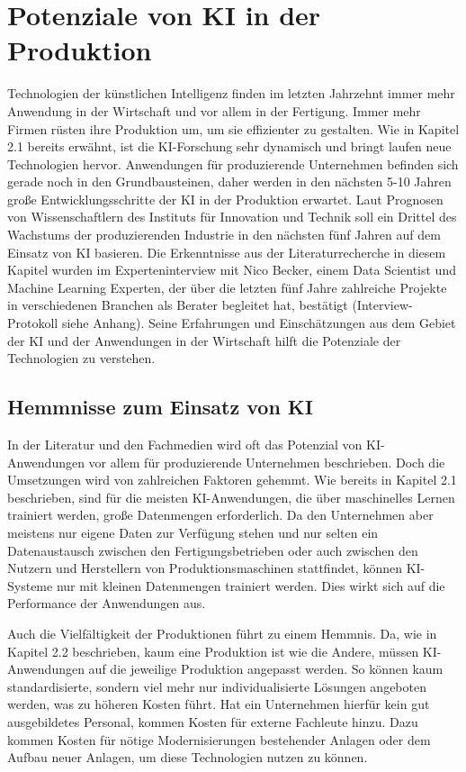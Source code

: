 \documentclass[a4paper,12pt, german]{report}
\begin{document}
\chapter{Potenziale von KI in der Produktion}
Technologien der künstlichen Intelligenz finden im letzten Jahrzehnt immer mehr Anwendung in der Wirtschaft und vor allem in der Fertigung. Immer mehr Firmen rüsten ihre Produktion um, um sie effizienter zu gestalten. Wie in Kapitel 2.1 bereits erwähnt, ist die KI-Forschung sehr dynamisch und bringt laufen neue Technologien hervor. Anwendungen für produzierende Unternehmen befinden sich gerade noch in den Grundbausteinen, daher werden in den nächsten 5-10 Jahren große Entwicklungsschritte der KI in der Produktion erwartet.\cite{08} 
Laut Prognosen von Wissenschaftlern des Instituts für Innovation und Technik soll ein Drittel des Wachstums der produzierenden Industrie in den nächsten fünf Jahren auf dem Einsatz von KI basieren.\cite{24}
Die Erkenntnisse aus der Literaturrecherche in diesem Kapitel wurden im Experteninterview mit Nico Becker, einem Data Scientist und Machine Learning Experten, der über die letzten fünf Jahre zahlreiche Projekte in verschiedenen Branchen als Berater begleitet hat, bestätigt (Interview-Protokoll siehe Anhang).\cite{41} Seine Erfahrungen und Einschätzungen aus dem Gebiet der KI und der Anwendungen in der Wirtschaft hilft die Potenziale der Technologien zu verstehen.

\section{Hemmnisse zum Einsatz von KI}
In der Literatur und den Fachmedien wird oft das Potenzial von KI-Anwendungen vor allem für produzierende Unternehmen beschrieben. Doch die Umsetzungen wird von zahlreichen Faktoren gehemmt. Wie bereits in Kapitel 2.1 beschrieben, sind für die meisten KI-Anwendungen, die über maschinelles Lernen trainiert werden, große Datenmengen erforderlich. Da den Unternehmen aber meistens nur eigene Daten zur Verfügung stehen und nur selten ein Datenaustausch zwischen den Fertigungsbetrieben oder auch zwischen den Nutzern und Herstellern von Produktionsmaschinen stattfindet, können KI-Systeme nur mit kleinen Datenmengen trainiert werden. Dies wirkt sich auf die Performance der Anwendungen aus.\cite{41}

Auch die Vielfältigkeit der Produktionen führt zu einem Hemmnis. Da, wie in Kapitel 2.2 beschrieben, kaum eine Produktion ist wie die Andere, müssen KI-Anwendungen auf die jeweilige Produktion angepasst werden. So können kaum standardisierte, sondern viel mehr nur individualisierte Lösungen angeboten werden, was zu höheren Kosten führt. Hat ein Unternehmen hierfür kein gut ausgebildetes Personal, kommen Kosten für externe Fachleute hinzu. Dazu kommen Kosten für nötige Modernisierungen bestehender Anlagen oder dem Aufbau neuer Anlagen, um diese Technologien nutzen zu können. \newline
\end{document}
